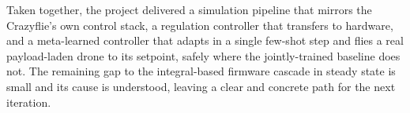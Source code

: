 \documentclass[11pt,a4paper]{article}
\theoremstyle{remark}
\numberwithin{equation}{section}
\begin{document}
Taken together, the project delivered a simulation pipeline that mirrors the
Crazyflie's own control stack, a regulation controller that transfers to hardware,
and a meta-learned controller that adapts in a single few-shot step and flies a
real payload-laden drone to its setpoint, safely where the jointly-trained baseline
does not. The remaining gap to the integral-based firmware cascade in steady state
is small and its cause is understood, leaving a clear and concrete path for the
next iteration.

\newpage


\end{document}
